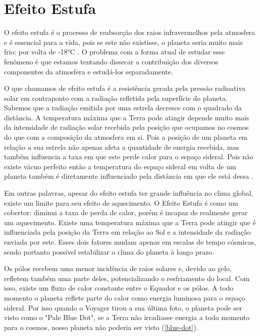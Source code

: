 \chapter[Efeito Estufa]{Efeito Estufa}

O efeito estufa é o processo de reabsorção dos raios infravermelhos pela atmosfera e é essencial para a vida, pois se este não existisse, o planeta seria muito mais frio: por volta de -18°C \cite{Nasa-cold}. O problema com a forma atual de estudar esse fenõmeno é que estamos tentando dissecar a contribuição dos diversos componentes da atmosfera e estudá-los separadamente.

O que chamamos de efeito estufa é a resistência gerada pela pressão radioativa solar em contraponto com a radiação refletida pela superfície do planeta. Sabemos que a radiação emitida por uma estrela decresce com o quadrado da distância. A temperatura máxima que a Terra pode atingir depende muito mais da intensidade de radiação solar recebida pela posição que ocupamos no cosmos do que com a composição da atmosfera em si. Pois a posição de um planeta em relação a sua estrela não apenas afeta a quantidade de energia recebida, mas também influencia a taxa em que este perde calor para o espaço sideral. Pois não existe vácuo perfeito então a temperatura do espaço sideral em volta de um planeta também é diretamente influenciado pela distância em que ele está dessa \cite{Cosmic-wave}.

Em outras palavras, apesar do efeito estufa ter grande influência no clima global, existe um limite para seu efeito de aquecimento. O Efeito Estufa é como um cobertor:  diminui a taxa de perda de calor, porém é incapaz de realmente gerar um aquecimento. Existe uma temperatura máxima que a Terra pode atingir que é influenciada pela posição da Terra em relação ao Sol e a intensidade da radiação enviada por este. Esses dois fatores mudam apenas em escalas de tempo cósmicas, sendo portanto possível estabilizar o clima do planeta à longo prazo.

Os pólos recebem uma menor incidência de raios solares e, devido ao gelo, refletem também uma parte deles,  potencializando o resfriamento do local. Com isso, existe um fluxo de calor constante entre o Equador e os pólos. A todo momento o planeta reflete parte do calor como energia luminosa para o espaço sideral. Por isso quando o Voyager tirou a sua última foto, o planeta pode ser visto como o "Pale Blue Dot", se a Terra não irradiasse energia a todo momento para o cosmos, nosso planeta não poderia ser visto (\autoref{blue-dot}).

